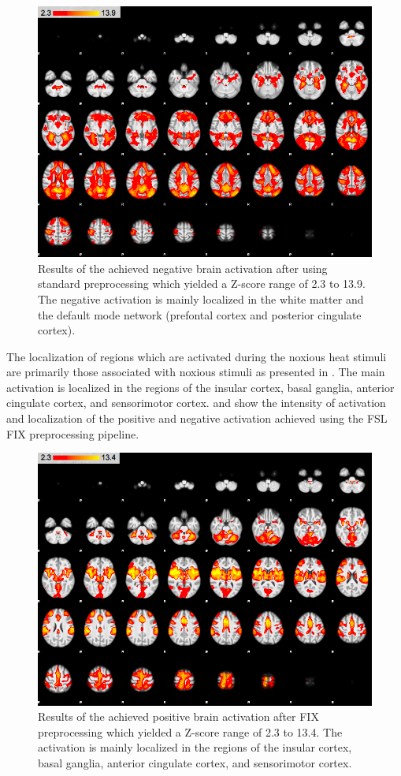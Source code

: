 \begin{figure}[H]                 
	\includegraphics[width=.65\textwidth]{figures/Results/STD_neg}  
	\caption{Results of the achieved negative brain activation after using standard preprocessing which yielded a Z-score range of 2.3 to 13.9. The negative activation is mainly localized in the white matter and the default mode network (prefontal cortex and posterior cingulate cortex).}
	\label{fig:res:stdneg} 
\end{figure}

The localization of regions which are activated during the noxious heat stimuli are primarily those associated with noxious stimuli as presented in . The main activation is localized in the regions of the insular cortex, basal ganglia, anterior cingulate cortex, and sensorimotor cortex. %
 and  show the intensity of activation and localization of the positive and negative activation achieved using the FSL FIX preprocessing pipeline. 

\begin{figure}[H]                 
	\includegraphics[width=.65\textwidth]{figures/Results/FIX_pos}  
	\caption{Results of the achieved positive brain activation after FIX preprocessing which yielded a Z-score range of 2.3 to 13.4. The activation is mainly localized in the regions of the insular cortex, basal ganglia, anterior cingulate cortex, and sensorimotor cortex.}
	\label{fig:res:FIXpos} 
\end{figure}

